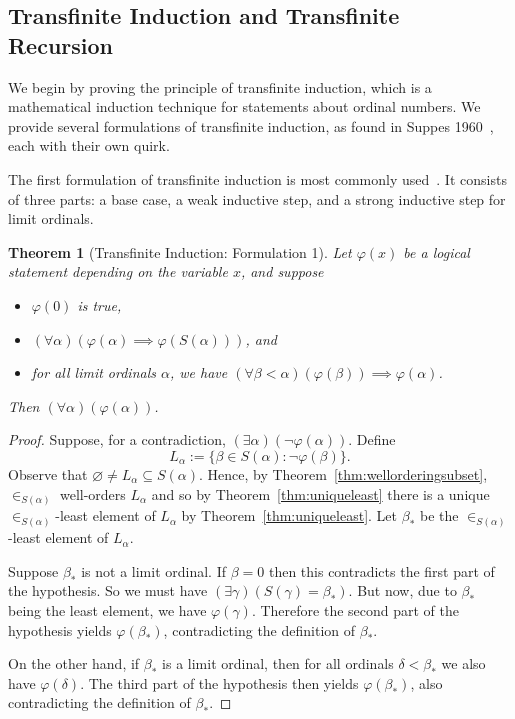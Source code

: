 \documentclass[a4paper,11pt]{article}
\theoremstyle{plain}
\newtheorem{thm}{Theorem}[subsection]
\theoremstyle{definition}
\theoremstyle{remark}
\begin{document}
\subsection{Transfinite Induction and Transfinite Recursion}
We begin by proving the principle of transfinite induction, which is a mathematical induction technique for statements about ordinal numbers. We provide several formulations of transfinite induction, as found in Suppes 1960~\citep[pp. 195--197]{SuppesBook}, each with their own quirk.

The first formulation of transfinite induction is most commonly used~\citep[pp. 205--224]{SuppesBook}. It consists of three parts: a base case, a weak inductive step, and a strong inductive step for limit ordinals.
\begin{thm}[Transfinite Induction: Formulation 1]
\label{thm:Tinduction1}
Let $\varphi(x)$ be a logical statement depending on the variable $x$, and suppose
\begin{itemize}
\item $\varphi(0)$ is true,
\item $(\forall\alpha)(\varphi(\alpha)\implies\varphi(S(\alpha)))$, and
\item for all limit ordinals $\alpha$, we have $(\forall\beta<\alpha)(\varphi(\beta)) \implies \varphi(\alpha)$.
\end{itemize}
Then $(\forall\alpha)(\varphi(\alpha))$.
\end{thm}
\begin{proof}
Suppose, for a contradiction, $(\exists\alpha)(\lnot\varphi(\alpha))$. Define
\[L_\alpha := \{\beta\in S(\alpha): \lnot\varphi(\beta)\}.\]
Observe that $\varnothing \neq L_\alpha \subseteq S(\alpha)$. Hence, by Theorem~\ref{thm:wellorderingsubset}, $\in_{S(\alpha)}$ well-orders $L_\alpha$ and so by Theorem~\ref{thm:uniqueleast} there is a unique $\in_{S(\alpha)}$-least element of $L_\alpha$ by Theorem~\ref{thm:uniqueleast}. Let $\beta_*$ be the $\in_{S(\alpha)}$-least element of $L_\alpha$.

Suppose $\beta_*$ is not a limit ordinal. If $\beta=0$ then this contradicts the first part of the hypothesis. So we must have $(\exists\gamma)(S(\gamma)=\beta_*)$. But now, due to $\beta_*$ being the least element, we have $\varphi(\gamma)$. Therefore the second part of the hypothesis yields $\varphi(\beta_*)$, contradicting the definition of $\beta_*$. 

On the other hand, if $\beta_*$ is a limit ordinal, then for all ordinals $\delta<\beta_*$ we also have $\varphi(\delta)$. The third part of the hypothesis then yields $\varphi(\beta_*)$, also contradicting the definition of $\beta_*$.
\end{proof}
\end{document}
